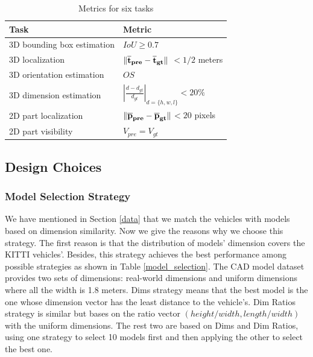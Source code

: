 \documentclass[a4paper,12pt]{article}
\begin{document}

\renewcommand{\arraystretch}{1.5}
\begin{table}[ht]
	\centering
	\caption{Metrics for six tasks}
	\label{metric}
	\begin{tabular}{|m{6cm}|m{6cm}|}
		\hline
		Task                    & Metric         \\ \hline
		3D bounding box estimation    & $IoU \geq 0.7$ \\  \hline
		3D localization         &$\bf \lVert \overline t_{pre} - \overline t_{gt} \rVert$ $< 1 / 2$ meters   \\ \hline
		3D orientation estimation  & $OS$     \\ \hline
		3D dimension estimation & $\left | \frac{d-d_{gt}}{d_{gt}} \right | _{d =\{h,w,l\}}<  20\%$           \\ \hline
		2D part localization    & $ \bf \lVert \overline p_{pre} - \overline p_{gt} \rVert $$<  20$ pixels      \\ \hline
		2D part visibility      &     $V_{pre} = V_{gt}$         \\ \hline
	\end{tabular}
\end{table}



\subsection{Design Choices}
\label{d_choices}

\subsubsection{Model Selection Strategy}
We have mentioned in Section \ref{data} that we match the vehicles with models based on dimension similarity. Now we give the reasons why we choose this strategy. The first reason is that the distribution of models' dimension covers the KITTI vehicles'. Besides, this strategy achieves the best performance among possible strategies as shown in Table \ref{model_selection}. The CAD model dataset provides two sets of dimensions: real-world dimensions and uniform dimensions where all the width is 1.8 meters. Dims strategy means that the best model is the one whose dimension vector has the least distance to the vehicle's. Dim Ratios strategy is similar but bases on the ratio vector $(height/width, length/width)$ with the uniform dimensions. The rest two are based on Dims and Dim Ratios, \ie using one strategy to select 10 models first and then applying the other to select the best one.
\end{document}

